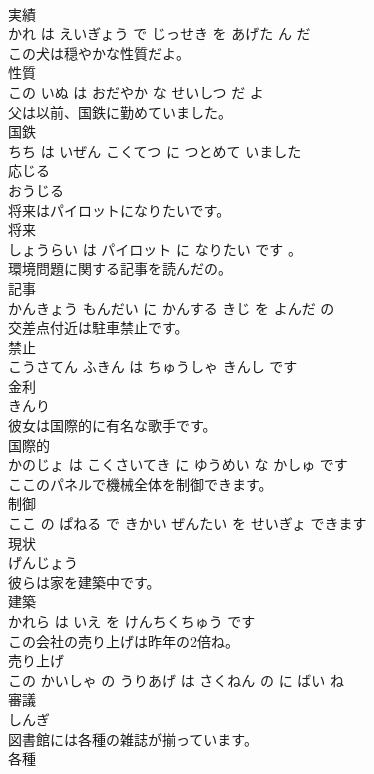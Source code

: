 \documentclass[8pt]{extreport}
\begin{document}
\begin{CJK}{UTF8}{min}
\\	実績 
\\	かれ は えいぎょう で じっせき を あげた ん だ			
\\	この犬は穏やかな性質だよ。	
\\	性質 
\\	この いぬ は おだやか な せいしつ だ よ			
\\	父は以前、国鉄に勤めていました。	
\\	国鉄 
\\	ちち は いぜん こくてつ に つとめて いました			
\\	応じる	
\\	おうじる			
\\	将来はパイロットになりたいです。	
\\	将来 
\\	しょうらい は パイロット に なりたい です 。			
\\	環境問題に関する記事を読んだの。	
\\	記事 
\\	かんきょう もんだい に かんする きじ を よんだ の			
\\	交差点付近は駐車禁止です。	
\\	禁止 
\\	こうさてん ふきん は ちゅうしゃ きんし です			
\\	金利	
\\	きんり			
\\	彼女は国際的に有名な歌手です。	
\\	国際的 
\\	かのじょ は こくさいてき に ゆうめい な かしゅ です			
\\	ここのパネルで機械全体を制御できます。	
\\	制御 
\\	ここ の ぱねる で きかい ぜんたい を せいぎょ できます			
\\	現状	
\\	げんじょう			
\\	彼らは家を建築中です。	
\\	建築 
\\	かれら は いえ を けんちくちゅう です			
\\	この会社の売り上げは昨年の2倍ね。	
\\	売り上げ 
\\	この かいしゃ の うりあげ は さくねん の に ばい ね			
\\	審議	
\\	しんぎ			
\\	図書館には各種の雑誌が揃っています。	
\\	各種 

\end{CJK}
\end{document}
